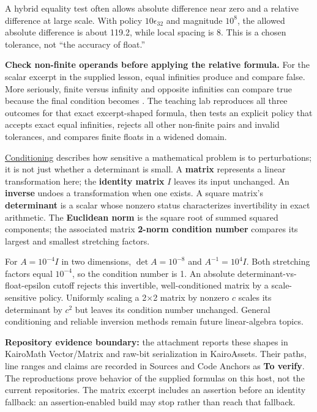 A hybrid equality test often allows absolute difference near zero and a relative difference at large scale. With policy \(10\epsilon_{32}\) and magnitude \(10^8\), the allowed absolute difference is about 119.2, while local spacing is 8. This is a chosen tolerance, not ``the accuracy of float.''

\textbf{Check non-finite operands before applying the relative formula.} For the scalar excerpt in the supplied lesson, equal infinities produce  and compare false. More seriously, finite versus infinity and opposite infinities can compare true because the final condition becomes . The teaching lab reproduces all three outcomes for that exact excerpt-shaped formula, then tests an explicit policy that accepts exact equal infinities, rejects all other non-finite pairs and invalid tolerances, and compares finite floats in a widened domain.

\hyperref[appendix-8f6a01f284a7]{Conditioning} describes how sensitive a mathematical problem is to perturbations; it is not just whether a determinant is small. A \textbf{matrix} represents a linear transformation here; the \textbf{identity matrix} \(I\) leaves its input unchanged. An \textbf{inverse} undoes a transformation when one exists. A square matrix's \textbf{determinant} is a scalar whose nonzero status characterizes invertibility in exact arithmetic. The \textbf{Euclidean norm} is the square root of summed squared components; the associated matrix \textbf{2-norm condition number} compares its largest and smallest stretching factors.

For \(A=10^{-4}I\) in two dimensions, \(\det A=10^{-8}\) and \(A^{-1}=10^4I\). Both stretching factors equal \(10^{-4}\), so the condition number is 1. An absolute determinant-vs-float-epsilon cutoff rejects this invertible, well-conditioned matrix by a scale-sensitive policy. Uniformly scaling a 2×2 matrix by nonzero \(c\) scales its determinant by \(c^2\) but leaves its condition number unchanged. General conditioning and reliable inversion methods remain future linear-algebra topics.

\textbf{Repository evidence boundary:} the attachment reports these shapes in KairoMath Vector/Matrix and raw-bit serialization in KairoAssets. Their paths, line ranges and claims are recorded in Sources and Code Anchors as \textbf{To verify}. The reproductions prove behavior of the supplied formulas on this host, not the current repositories. The matrix excerpt includes an assertion before an identity fallback: an assertion-enabled build may stop rather than reach that fallback.

